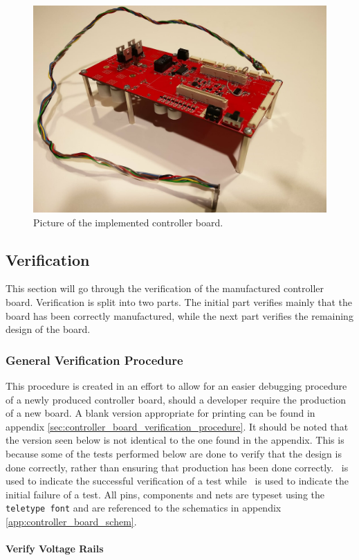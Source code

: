 \begin{figure}[h]
	\centering
	\includegraphics[width=.75\linewidth]{graphics/controllerboard_real}
	\caption{Picture of the implemented controller board.}
	\label{fig:controller_board_img}
\end{figure}
\subsection{Verification} %
\label{ssub:verifaction}
This section will go through the verification of the manufactured controller board.
Verification is split into two parts.
The initial part verifies mainly that the board has been correctly manufactured, while the next part verifies the remaining design of the board. 

\subsubsection{General Verification Procedure} %
\label{ssub:verification_procedure}
This procedure is created in an effort to allow for an easier debugging procedure of a newly produced controller board, should a developer require the production of a new board.
A blank version appropriate for printing can be found in appendix \ref{sec:controller_board_verification_procedure}.
It should be noted that the version seen below is not identical to the one found in the appendix.
This is because some of the tests performed below are done to verify that the design is done correctly, rather than ensuring that production has been done correctly.
\cmark ~is used to indicate the successful verification of a test while \xmark ~is used to indicate the initial failure of a test.
All pins, components and nets are typeset using the \texttt{teletype font} and are referenced to the schematics in appendix \ref{app:controller_board_schem}.
\paragraph{Verify Voltage Rails} %
\label{par:verify_voltage_rails}

